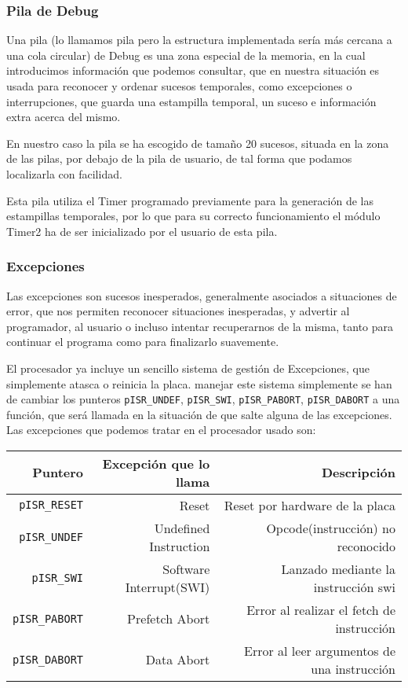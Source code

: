 \documentclass[12pt,letterpaper]{article}
\begin{document}
\subsubsection{Pila de Debug}
\label{subsubsec:pila-debug}
Una pila (lo llamamos pila pero la estructura implementada sería más
cercana a una cola circular) de Debug es una zona especial de la
memoria, en la cual introducimos información que podemos consultar,
que en nuestra situación es usada para reconocer y ordenar sucesos
temporales, como excepciones o interrupciones, que guarda una
estampilla temporal, un suceso e información extra acerca del mismo.

En nuestro caso la pila se ha escogido de tamaño 20 sucesos, situada
en la zona de las pilas, por debajo de la pila de usuario, de tal
forma que podamos localizarla con facilidad.

Esta pila utiliza el Timer programado previamente para la generación
de las estampillas temporales, por lo que para su correcto
funcionamiento el módulo Timer2 ha de ser inicializado por el usuario
de esta pila.

\subsubsection{Excepciones}
\label{subsubsec:excepciones}
Las excepciones son sucesos inesperados, generalmente asociados a
situaciones de error, que nos permiten reconocer situaciones
inesperadas, y advertir al programador, al usuario o incluso intentar
recuperarnos de la misma, tanto para continuar el programa como para
finalizarlo suavemente.

El procesador ya incluye un sencillo sistema de gestión de
Excepciones, que simplemente atasca o reinicia la placa. manejar este
sistema simplemente se han de cambiar los punteros
\texttt{pISR\_UNDEF}, \texttt{pISR\_SWI}, \texttt{pISR\_PABORT},
\texttt{pISR\_DABORT} a una función, que será llamada en la situación
de que salte alguna de las excepciones.
Las excepciones que podemos tratar en el procesador usado son:
  \begin{center}
    \begin{tabular}{ r | r | r}
      Puntero                & Excepción que lo llama  & Descripción                                 \\
      \hline
      \texttt{pISR\_RESET}   & Reset                   & Reset por hardware de la placa              \\
      \texttt{pISR\_UNDEF}   & Undefined Instruction   & Opcode(instrucción) no reconocido           \\
      \texttt{pISR\_SWI}     & Software Interrupt(SWI) & Lanzado mediante la instrucción swi         \\
      \texttt{pISR\_PABORT}  & Prefetch Abort          & Error al realizar el fetch de instrucción   \\
      \texttt{pISR\_DABORT}  & Data Abort              & Error al leer argumentos de una instrucción \\
    \end{tabular}
  \end{center}
\end{document}
